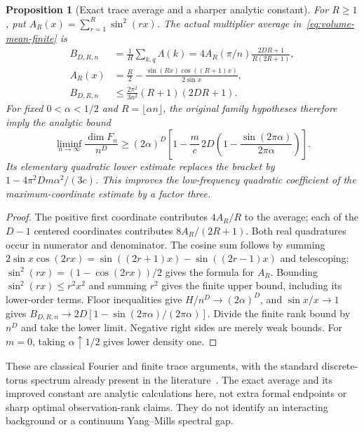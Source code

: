 \documentclass[11pt]{article}
\newtheorem{proposition}[theorem]{Proposition}
\begin{document}
\begin{proposition}[Exact trace average and a sharper analytic constant]\label{prop:volume-average}
For $R\geq1$, put $A_R(x)=\sum_{r=1}^R\sin^2(rx)$. The actual multiplier
average in~\eqref{eq:volume-mean-finite} is
\begin{align*}
 B_{D,R,n}&=\frac1H\sum_{k,q}\Lambda(k)
   =4A_R(\pi/n)\frac{2DR+1}{R(2R+1)},\\
 A_R(x)&=\frac R2-\frac{\sin(Rx)\cos((R+1)x)}{2\sin x},\\
 B_{D,R,n}&\leq\frac{2\pi^2}{3n^2}(R+1)(2DR+1).
\end{align*}
For fixed $0<\alpha<1/2$ and $R=\lfloor\alpha n\rfloor$, the original
family hypotheses therefore imply the analytic bound
\[
 \liminf_{n\to\infty}\frac{\dim F_n}{n^D}
 \geq(2\alpha)^D\left[1-\frac mc\,2D
       \left(1-\frac{\sin(2\pi\alpha)}{2\pi\alpha}\right)\right].
\]
Its elementary quadratic lower estimate replaces the bracket by
$1-4\pi^2Dm\alpha^2/(3c)$. This improves the low-frequency quadratic
coefficient of the maximum-coordinate estimate by a factor three.
\end{proposition}
\begin{proof}
The positive first coordinate contributes $4A_R/R$ to the average; each
of the $D-1$ centered coordinates contributes $8A_R/(2R+1)$. Both real
quadratures occur in numerator and denominator. The cosine sum follows by
summing $2\sin x\cos(2rx)=\sin((2r+1)x)-\sin((2r-1)x)$ and telescoping;
$\sin^2(rx)=(1-\cos(2rx))/2$ gives the formula for $A_R$.
Bounding $\sin^2(rx)\leq r^2x^2$ and summing $r^2$ gives the finite upper
bound, including its lower-order terms. Floor inequalities give
$H/n^D\to(2\alpha)^D$, and $\sin x/x\to1$ gives
$B_{D,R,n}\to2D[1-\sin(2\pi\alpha)/(2\pi\alpha)]$. Divide the finite
rank bound by $n^D$ and take the lower limit. Negative right sides are merely
weak bounds. For $m=0$, taking $\alpha\uparrow1/2$ gives lower density one.
\end{proof}
These are classical Fourier and finite trace arguments, with the standard
discrete-torus spectrum already present in the literature~\cite{lin-wan-zhang}. The exact average
and its improved constant are analytic calculations here, not extra formal
endpoints or sharp optimal observation-rank claims. They do not identify an
interacting background or a continuum Yang--Mills spectral gap.
\end{document}
